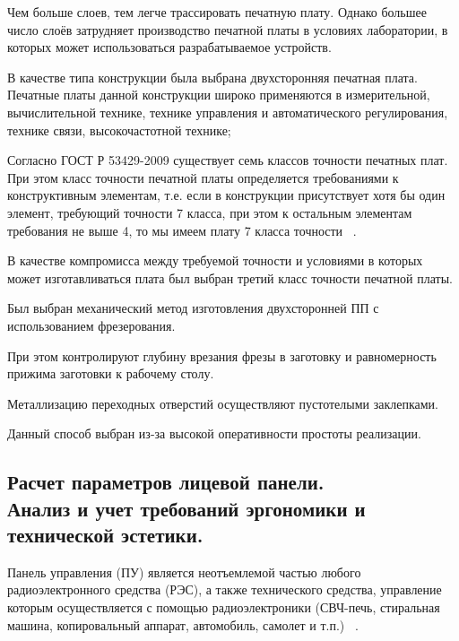 Чем больше слоев, тем легче трассировать печатную плату.
Однако большее число слоёв затрудняет производство печатной платы
в условиях лаборатории, в которых может использоваться разрабатываемое
устройств.


В качестве типа конструкции была выбрана двухсторонняя печатная плата.
Печатные платы данной конструкции широко применяются в измерительной,
вычислительной технике, технике управления и автоматического регулирования,
технике связи, высокочастотной технике;

 Согласно ГОСТ Р 53429-2009 существует семь классов точности печатных
плат. При этом класс точности печатной платы определяется требованиями
к конструктивным элементам, т.е. если в конструкции присутствует хотя
бы один элемент, требующий точности 7 класса, при этом к остальным
элементам требования не выше 4, то мы имеем плату 7 класса точности
~\cite{rezonit-class}.

В качестве компромисса между требуемой точности и условиями в которых
может изготавливаться плата был выбран третий класс точности печатной
платы.


% 
%
Был выбран механический метод изготовления двухсторонней ПП с
использованием фрезерования.

При этом контролируют глубину врезания фрезы
в заготовку и равномерность прижима заготовки к рабочему
столу.

Металлизацию переходных отверстий
осуществляют пустотелыми
заклепками.

Данный способ выбран из-за высокой оперативности простоты реализации.

\subsection{Расчет параметров лицевой панели. \\
  Анализ и учет требований эргономики и технической эстетики. }
Панель управления (ПУ) является неотъемлемой частью любого
радиоэлектронного средства (РЭС),
а также технического средства, управление
которым осуществляется с помощью радиоэлектроники
(СВЧ-печь, стиральная машина,
копировальный аппарат, автомобиль, самолет и т.п.) ~\cite{Alipherenko2007}.

